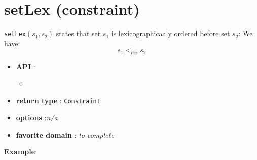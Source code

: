 \label{setlex}
\hypertarget{setlex}{}

\section{setLex (constraint)}\label{setlex:setlexconstraint}\hypertarget{setlex:setlexconstraint}{}
\begin{notedef}
  \texttt{setLex}$(s_1,s_2)$ states that set $s_1$ is lexicographicaaly ordered before set $s_2$:
 We have:
$$ s_1 <_{lex} s_2 $$

\end{notedef}

\begin{itemize}
	\item \textbf{API} :
	\begin{itemize}
		\item {}
	\end{itemize}
	\item \textbf{return type} : \texttt{Constraint}
	\item \textbf{options} :\emph{n/a}
	\item \textbf{favorite domain} : \emph{to complete}
\end{itemize}

\textbf{Example}:
